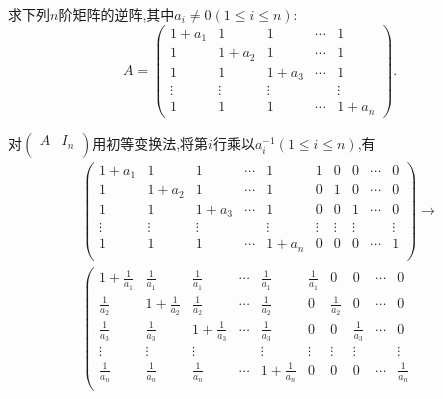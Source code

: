 \documentclass[lang=cn,newtx,10pt,scheme=chinese]{elegantbook}
\begin{document}
\begin{exercise}\label{exercise2.3}
求下列\(n\)阶矩阵的逆阵,其中\(a_i \neq 0(1\leq i\leq n)\):
\[
A = 
\begin{pmatrix}
1 + a_1 & 1 & 1 & \cdots & 1 \\
1 & 1 + a_2 & 1 & \cdots & 1 \\
1 & 1 & 1 + a_3 & \cdots & 1 \\
\vdots & \vdots & \vdots & & \vdots \\
1 & 1 & 1 & \cdots & 1 + a_n
\end{pmatrix}.
\]
\end{exercise}
\begin{solution}
    对\(\left( \begin{matrix}
        A&		I_n\\
    \end{matrix} \right) \)用初等变换法,将第\(i\)行乘以\(a_i^{-1}(1\leq i\leq n)\),有
\begin{gather*}
        \left( \begin{matrix}
            1+a_1&		1&		1&		\cdots&		1&		1&		0&		0&		\cdots&		0\\
            1&		1+a_2&		1&		\cdots&		1&		0&		1&		0&		\cdots&		0\\
            1&		1&		1+a_3&		\cdots&		1&		0&		0&		1&		\cdots&		0\\
            \vdots&		\vdots&		\vdots&		&		\vdots&		\vdots&		\vdots&		\vdots&		&		\vdots\\
            1&		1&		1&		\cdots&		1+a_n&		0&		0&		0&		\cdots&		1\\
        \end{matrix} \right) \rightarrow 
        \\
        \left( \begin{matrix}
            1+\frac{1}{a_1}&		\frac{1}{a_1}&		\frac{1}{a_1}&		\cdots&		\frac{1}{a_1}&		\frac{1}{a_1}&		0&		0&		\cdots&		0\\
            \frac{1}{a_2}&		1+\frac{1}{a_2}&		\frac{1}{a_2}&		\cdots&		\frac{1}{a_2}&		0&		\frac{1}{a_2}&		0&		\cdots&		0\\
            \frac{1}{a_3}&		\frac{1}{a_3}&		1+\frac{1}{a_3}&		\cdots&		\frac{1}{a_3}&		0&		0&		\frac{1}{a_3}&		\cdots&		0\\
            \vdots&		\vdots&		\vdots&		&		\vdots&		\vdots&		\vdots&		\vdots&		&		\vdots\\
            \frac{1}{a_n}&		\frac{1}{a_n}&		\frac{1}{a_n}&		\cdots&		1+\frac{1}{a_n}&		0&		0&		0&		\cdots&		\frac{1}{a_n}\\

\end{matrix}
\end{gather*}
\end{solution}
\end{document}
